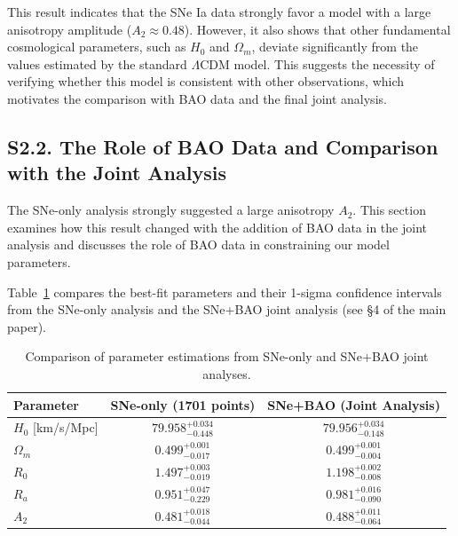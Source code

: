 \documentclass[a4paper,12pt]{article}
\begin{document}
This result indicates that the SNe Ia data strongly favor a model with a large anisotropy amplitude ($A_2 \approx 0.48$). However, it also shows that other fundamental cosmological parameters, such as $H_0$ and $\Omega_m$, deviate significantly from the values estimated by the standard $\Lambda$CDM model. This suggests the necessity of verifying whether this model is consistent with other observations, which motivates the comparison with BAO data and the final joint analysis.

\subsection*{S2.2. The Role of BAO Data and Comparison with the Joint Analysis}
\label{subsec:supp_joint_comparison}

The SNe-only analysis strongly suggested a large anisotropy $A_2$. This section examines how this result changed with the addition of BAO data in the joint analysis and discusses the role of BAO data in constraining our model parameters.

Table~\ref{tab:supp_param_comparison} compares the best-fit parameters and their 1-sigma confidence intervals from the SNe-only analysis and the SNe+BAO joint analysis (see §4 of the main paper).

\begin{table}[H]
    \centering
    \caption{Comparison of parameter estimations from SNe-only and SNe+BAO joint analyses.}
    \label{tab:supp_param_comparison}
    \begin{tabular}{@{}lcc@{}}
        \toprule
        \textbf{Parameter} & \textbf{SNe-only (1701 points)} & \textbf{SNe+BAO (Joint Analysis)} \\
        \midrule
        $H_0$ [km/s/Mpc] & $79.958 ^{+0.034} _{-0.448}$ & $79.956 ^{+0.034} _{-0.148}$ \\
        $\Omega_m$ & $0.499 ^{+0.001} _{-0.017}$ & $0.499 ^{+0.001} _{-0.004}$ \\
        $R_0$ & $1.497 ^{+0.003} _{-0.019}$ & $1.198 ^{+0.002} _{-0.008}$ \\
        $R_a$ & $0.951 ^{+0.047} _{-0.229}$ & $0.981 ^{+0.016} _{-0.090}$ \\
        $A_2$ & $0.481 ^{+0.018} _{-0.044}$ & $0.488 ^{+0.011} _{-0.064}$ \\
        \bottomrule
    \end{tabular}
\end{table}
\end{document}
